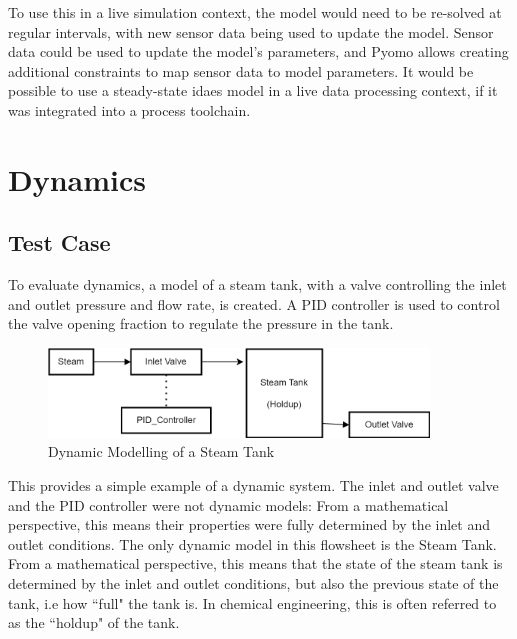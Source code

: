 \documentclass[12pt]{article}
\begin{document}

To use this in a live simulation context, the model would need to be re-solved at regular intervals, with new sensor data being used to update the model. Sensor data could be used to update the model's parameters, and Pyomo allows creating additional constraints to map sensor data to model parameters. It would be possible to use a steady-state idaes model in a live data processing context, if it was integrated into a process toolchain.


\section{Dynamics}


\subsection{Test Case}

To evaluate dynamics, a model of a steam tank, with a valve controlling the inlet and outlet pressure and flow rate, is created. A PID controller is used to control the valve opening fraction to regulate the pressure in the tank.

\begin{figure}
    \includegraphics[width=0.9\textwidth]{../dynamicmodelling.png}
    \caption{Dynamic Modelling of a Steam Tank}
    \label{fig:dynamicmodelling}
\end{figure}

This provides a simple example of a dynamic system. The inlet and outlet valve and the PID controller were not dynamic models: From a mathematical perspective, this means their properties were fully determined by the inlet and outlet conditions. The only dynamic model in this flowsheet is the Steam Tank. From a mathematical perspective, this means that the state of the steam tank is determined by the inlet and outlet conditions, but also the previous state of the tank, i.e how ``full" the tank is. In chemical engineering, this is often referred to as the ``holdup" of the tank.

\end{document}

